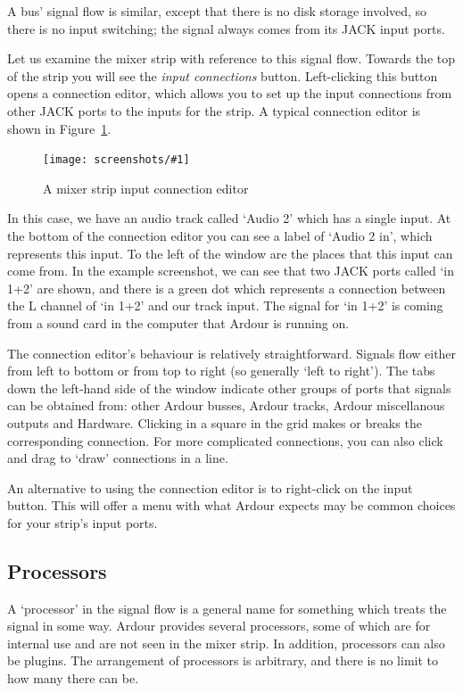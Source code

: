 \documentclass[10pt,a4paper]{book}
\newcommand{\screenshot}[3]{%
\begin{figure}[ht]%
\begin{center}
\texttt{[image: screenshots/\#1]}
\end{center}
\caption{#2}
\label{#3}
\end{figure}}
\begin{document}
{A bus' signal flow is similar, except that there is no disk storage
involved, so there is no input switching; the signal always comes from
its JACK input ports.

Let us examine the mixer strip with reference to this signal flow.
Towards the top of the strip you will see the \emph{input connections}
button.  Left-clicking this button opens a connection editor, which
allows you to set up the input connections from other JACK ports to
the inputs for the strip.  A typical connection editor is shown in
Figure~\ref{fig:input-connection-matrix}.

\screenshot{input-connection-matrix.png}{A mixer strip input connection editor}{fig:input-connection-matrix}

In this case, we have an audio track called `Audio 2' which has a
single input.  At the bottom of the connection editor you can see a
label of `Audio 2 in', which represents this input.  To the left of
the window are the places that this input can come from.  In the
example screenshot, we can see that two JACK ports called `in 1+2' are
shown, and there is a green dot which represents a connection between
the L channel of `in 1+2' and our track input.  The signal for `in
1+2' is coming from a sound card in the computer that Ardour is
running on.

The connection editor's behaviour is relatively straightforward.
Signals flow either from left to bottom or from top to right (so
generally `left to right').  The tabs down the left-hand side of the
window indicate other groups of ports that signals can be obtained
from: other Ardour busses, Ardour tracks, Ardour miscellanous outputs
and Hardware.  Clicking in a square in the grid makes or breaks the
corresponding connection.  For more complicated connections, you can
also click and drag to `draw' connections in a line.

An alternative to using the connection editor is to right-click on the
input button.  This will offer a menu with what Ardour expects may be
common choices for your strip's input ports.

\subsection{Processors}

A `processor' in the signal flow is a general name for something which
treats the signal in some way.  Ardour provides several processors,
some of which are for internal use and are not seen in the mixer
strip.  In addition, processors can also be plugins.  The arrangement
of processors is arbitrary, and there is no limit to how many there
can be.

}
\end{document}
